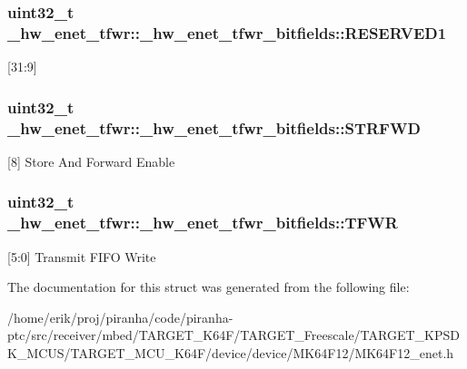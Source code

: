 \subsubsection[{\texorpdfstring{R\+E\+S\+E\+R\+V\+E\+D1}{RESERVED1}}]{\setlength{\rightskip}{0pt plus 5cm}uint32\+\_\+t \+\_\+hw\+\_\+enet\+\_\+tfwr\+::\+\_\+hw\+\_\+enet\+\_\+tfwr\+\_\+bitfields\+::\+R\+E\+S\+E\+R\+V\+E\+D1}\hypertarget{struct__hw__enet__tfwr_1_1__hw__enet__tfwr__bitfields_a62797bbc447b7495bcc749c7747dd561}{}\label{struct__hw__enet__tfwr_1_1__hw__enet__tfwr__bitfields_a62797bbc447b7495bcc749c7747dd561}
\mbox{[}31\+:9\mbox{]} 
\subsubsection[{\texorpdfstring{S\+T\+R\+F\+WD}{STRFWD}}]{\setlength{\rightskip}{0pt plus 5cm}uint32\+\_\+t \+\_\+hw\+\_\+enet\+\_\+tfwr\+::\+\_\+hw\+\_\+enet\+\_\+tfwr\+\_\+bitfields\+::\+S\+T\+R\+F\+WD}\hypertarget{struct__hw__enet__tfwr_1_1__hw__enet__tfwr__bitfields_a5e58654f0872e5796703656027952df8}{}\label{struct__hw__enet__tfwr_1_1__hw__enet__tfwr__bitfields_a5e58654f0872e5796703656027952df8}
\mbox{[}8\mbox{]} Store And Forward Enable 
\subsubsection[{\texorpdfstring{T\+F\+WR}{TFWR}}]{\setlength{\rightskip}{0pt plus 5cm}uint32\+\_\+t \+\_\+hw\+\_\+enet\+\_\+tfwr\+::\+\_\+hw\+\_\+enet\+\_\+tfwr\+\_\+bitfields\+::\+T\+F\+WR}\hypertarget{struct__hw__enet__tfwr_1_1__hw__enet__tfwr__bitfields_a478f7685818e2d935d52282a227a5086}{}\label{struct__hw__enet__tfwr_1_1__hw__enet__tfwr__bitfields_a478f7685818e2d935d52282a227a5086}
\mbox{[}5\+:0\mbox{]} Transmit F\+I\+FO Write 

The documentation for this struct was generated from the following file\+:\begin{DoxyCompactItemize}
\item 
/home/erik/proj/piranha/code/piranha-\/ptc/src/receiver/mbed/\+T\+A\+R\+G\+E\+T\+\_\+\+K64\+F/\+T\+A\+R\+G\+E\+T\+\_\+\+Freescale/\+T\+A\+R\+G\+E\+T\+\_\+\+K\+P\+S\+D\+K\+\_\+\+M\+C\+U\+S/\+T\+A\+R\+G\+E\+T\+\_\+\+M\+C\+U\+\_\+\+K64\+F/device/device/\+M\+K64\+F12/M\+K64\+F12\+\_\+enet.\+h\end{DoxyCompactItemize}
